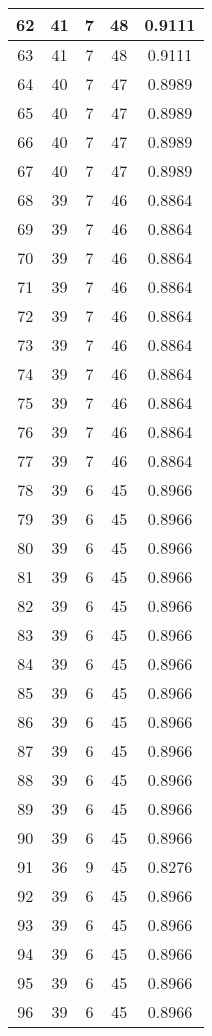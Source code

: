 \documentclass[letterpaper, 12pt]{article}
\begin{document}
\begin{longtable}{|c|c|c|c|c|}
\hline
62 & 41 & 7 & 48 & 0.9111 \\
\hline
63 & 41 & 7 & 48 & 0.9111 \\
\hline
64 & 40 & 7 & 47 & 0.8989 \\
\hline
65 & 40 & 7 & 47 & 0.8989 \\
\hline
66 & 40 & 7 & 47 & 0.8989 \\
\hline
67 & 40 & 7 & 47 & 0.8989 \\
\hline
68 & 39 & 7 & 46 & 0.8864 \\
\hline
69 & 39 & 7 & 46 & 0.8864 \\
\hline
70 & 39 & 7 & 46 & 0.8864 \\
\hline
71 & 39 & 7 & 46 & 0.8864 \\
\hline
72 & 39 & 7 & 46 & 0.8864 \\
\hline
73 & 39 & 7 & 46 & 0.8864 \\
\hline
74 & 39 & 7 & 46 & 0.8864 \\
\hline
75 & 39 & 7 & 46 & 0.8864 \\
\hline
76 & 39 & 7 & 46 & 0.8864 \\
\hline
77 & 39 & 7 & 46 & 0.8864 \\
\hline
78 & 39 & 6 & 45 & 0.8966 \\
\hline
79 & 39 & 6 & 45 & 0.8966 \\
\hline
80 & 39 & 6 & 45 & 0.8966 \\
\hline
81 & 39 & 6 & 45 & 0.8966 \\
\hline
82 & 39 & 6 & 45 & 0.8966 \\
\hline
83 & 39 & 6 & 45 & 0.8966 \\
\hline
84 & 39 & 6 & 45 & 0.8966 \\
\hline
85 & 39 & 6 & 45 & 0.8966 \\
\hline
86 & 39 & 6 & 45 & 0.8966 \\
\hline
87 & 39 & 6 & 45 & 0.8966 \\
\hline
88 & 39 & 6 & 45 & 0.8966 \\
\hline
89 & 39 & 6 & 45 & 0.8966 \\
\hline
90 & 39 & 6 & 45 & 0.8966 \\
\hline
91 & 36 & 9 & 45 & 0.8276 \\
\hline
92 & 39 & 6 & 45 & 0.8966 \\
\hline
93 & 39 & 6 & 45 & 0.8966 \\
\hline
94 & 39 & 6 & 45 & 0.8966 \\
\hline
95 & 39 & 6 & 45 & 0.8966 \\
\hline
96 & 39 & 6 & 45 & 0.8966 \\

\end{longtable}
\end{document}
